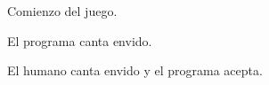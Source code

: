 \documentclass[12pt,a4paper]{article}
\begin{document}
\begin{figure}
\noindent {}
\caption{Comienzo del juego.}
\end{figure}

\begin{figure}
\noindent {}
\caption{El programa canta envido.}
\end{figure}

\begin{figure}
\noindent {}
\caption {El humano canta envido y el programa acepta.}
\end{figure}
\end{document}
